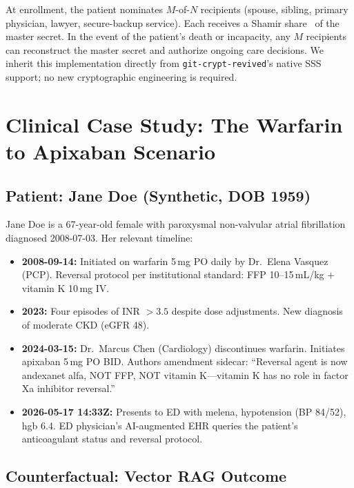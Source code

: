\documentclass[runningheads]{llncs}
\begin{document}
At enrollment, the patient nominates $M$-of-$N$ recipients (spouse,
sibling, primary physician, lawyer, secure-backup service). Each receives
a Shamir share~\cite{shamir1979} of the master secret. In the event of
the patient's death or incapacity, any $M$ recipients can reconstruct the
master secret and authorize ongoing care decisions. We inherit this
implementation directly from \texttt{git-crypt-revived}'s native SSS
support; no new cryptographic engineering is required.

\section{Clinical Case Study: The Warfarin to Apixaban Scenario}
\label{sec:clinical}

\subsection{Patient: Jane Doe (Synthetic, DOB 1959)}

Jane Doe is a 67-year-old female with paroxysmal non-valvular atrial
fibrillation diagnosed 2008-07-03. Her relevant timeline:

\begin{itemize}
  \item \textbf{2008-09-14:} Initiated on warfarin 5\,mg PO daily by
        Dr.\ Elena Vasquez (PCP). Reversal protocol per institutional
        standard: FFP 10--15\,mL/kg + vitamin K 10\,mg IV.
  \item \textbf{2023:} Four episodes of INR $>3.5$ despite dose adjustments.
        New diagnosis of moderate CKD (eGFR 48).
  \item \textbf{2024-03-15:} Dr.\ Marcus Chen (Cardiology) discontinues
        warfarin. Initiates apixaban 5\,mg PO BID. Authors amendment
        sidecar: ``Reversal agent is now andexanet alfa, NOT FFP,
        NOT vitamin K---vitamin K has no role in factor Xa inhibitor
        reversal.''
  \item \textbf{2026-05-17 14:33Z:} Presents to ED with melena, hypotension
        (BP 84/52), hgb 6.4. ED physician's AI-augmented EHR queries the
        patient's anticoagulant status and reversal protocol.
\end{itemize}

\subsection{Counterfactual: Vector RAG Outcome}
\end{document}
